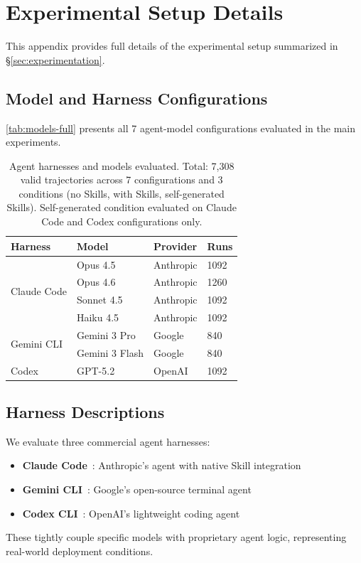 \section{Experimental Setup Details}
\label{app:exp-details}

This appendix provides full details of the experimental setup summarized in \S\ref{sec:experimentation}.

\subsection{Model and Harness Configurations}

\autoref{tab:models-full} presents all 7 agent-model configurations evaluated in the main experiments.

\begin{table}[htb]
\centering
\footnotesize
\caption{Agent harnesses and models evaluated. Total: 7,308 valid trajectories across 7 configurations and 3 conditions (no Skills, with Skills, self-generated Skills). Self-generated condition evaluated on Claude Code and Codex configurations only.}
\setlength{\tabcolsep}{3pt}
\begin{tabular}{llll}
\toprule
\textbf{Harness} & \textbf{Model} & \textbf{Provider} & \textbf{Runs} \\
\midrule
\multirow{4}{*}{Claude Code} & Opus 4.5 & Anthropic & 1092 \\
& Opus 4.6 & Anthropic & 1260 \\
& Sonnet 4.5 & Anthropic & 1092 \\
& Haiku 4.5 & Anthropic & 1092 \\
\midrule
\multirow{2}{*}{Gemini CLI} & Gemini 3 Pro & Google & 840 \\
& Gemini 3 Flash & Google & 840 \\
\midrule
Codex & GPT-5.2 & OpenAI & 1092 \\
\bottomrule
\end{tabular}

\label{tab:models-full}
\end{table}

\subsection{Harness Descriptions}

We evaluate three commercial agent harnesses:
\begin{itemize}[nosep]
    \item \textbf{Claude Code}~\citep{anthropic2025claudecode}: Anthropic's agent with native Skill integration
    \item \textbf{Gemini CLI}~\citep{google2025geminicli}: Google's open-source terminal agent
    \item \textbf{Codex CLI}~\citep{openai2025codexcli}: OpenAI's lightweight coding agent
\end{itemize}
These tightly couple specific models with proprietary agent logic, representing real-world deployment conditions.


